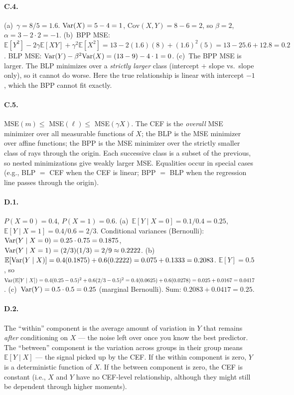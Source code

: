 \documentclass{article}
\newcommand{\E}{\mathbb{E}}
\begin{document}
\paragraph{C.4.}  (a)~$\gamma = 8/5 = 1.6$.  $\mbox{Var}(X) = 5 - 4 = 1$, $\text{Cov}(X,Y) = 8 - 6 = 2$, so $\beta = 2$, $\alpha = 3 - 2\cdot 2 = -1$.  (b)~BPP MSE: $\E[Y^2] - 2\gamma\E[XY] + \gamma^2\E[X^2] = 13 - 2(1.6)(8) + (1.6)^2(5) = 13 - 25.6 + 12.8 = 0.2$.  BLP MSE: $\mbox{Var}(Y) - \beta^2\mbox{Var}(X) = (13 - 9) - 4 \cdot 1 = 0$.  (c)~The BPP MSE is larger.  The BLP minimizes over a \emph{strictly larger} class (intercept $+$ slope vs.\ slope only), so it cannot do worse.  Here the true relationship is linear with intercept $-1$, which the BPP cannot fit exactly.

\paragraph{C.5.}  MSE$(m) \leq $ MSE$(\ell) \leq $ MSE$(\gamma X)$.  The CEF is the \emph{overall} MSE minimizer over all measurable functions of $X$; the BLP is the MSE minimizer over affine functions; the BPP is the MSE minimizer over the strictly smaller class of rays through the origin.  Each successive class is a subset of the previous, so nested minimizations give weakly larger MSE.  Equalities occur in special cases (e.g., BLP $=$ CEF when the CEF is linear; BPP $=$ BLP when the regression line passes through the origin).

\bigskip

\paragraph{D.1.}  $P(X=0) = 0.4$, $P(X=1) = 0.6$.  (a)~$\E[Y\mid X=0] = 0.1/0.4 = 0.25$, $\E[Y\mid X=1] = 0.4/0.6 = 2/3$.  Conditional variances (Bernoulli): $\mbox{Var}(Y\mid X=0) = 0.25 \cdot 0.75 = 0.1875$, $\mbox{Var}(Y\mid X=1) = (2/3)(1/3) = 2/9 \approx 0.2222$.  (b)~$\E[\Var(Y\mid X)] = 0.4(0.1875) + 0.6(0.2222) = 0.075 + 0.1333 = 0.2083$.  $\E[Y] = 0.5$, so $\Var(\E[Y\mid X]) = 0.4(0.25 - 0.5)^2 + 0.6(2/3 - 0.5)^2 = 0.4(0.0625) + 0.6(0.0278) = 0.025 + 0.0167 = 0.0417$.  (c)~$\mbox{Var}(Y) = 0.5 \cdot 0.5 = 0.25$ (marginal Bernoulli).  Sum: $0.2083 + 0.0417 = 0.25$. \checkmark

\paragraph{D.2.}  The ``within'' component is the average amount of variation in $Y$ that remains \emph{after} conditioning on $X$ --- the noise left over once you know the best predictor.  The ``between'' component is the variation across groups in their group means $\E[Y \mid X]$ --- the signal picked up by the CEF.  If the within component is zero, $Y$ is a deterministic function of $X$.  If the between component is zero, the CEF is constant (i.e., $X$ and $Y$ have no CEF-level relationship, although they might still be dependent through higher moments).
\end{document}
